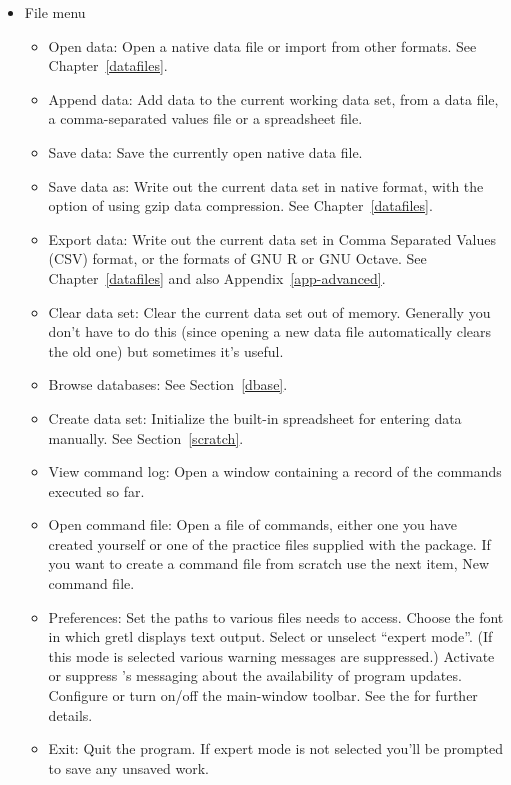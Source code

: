\begin{itemize}
\item \textsf{File menu}
  \begin{itemize}
  \item \textsf{Open data}: Open a native  data file or
    import from other formats.  See Chapter~\ref{datafiles}.
  \item \textsf{Append data}: Add data to the current working data
    set, from a  data file, a comma-separated values file
    or a spreadsheet file.
  \item \textsf{Save data}: Save the currently open native 
    data file.
  \item \textsf{Save data as}: Write out the current data set in
    native format, with the option of using gzip data compression. See
    Chapter~\ref{datafiles}.
  \item \textsf{Export data}: Write out the current data set in Comma
    Separated Values (CSV) format, or the formats of GNU R or GNU
    Octave. See Chapter~\ref{datafiles} and also
    Appendix~\ref{app-advanced}.
  \item \textsf{Clear data set}: Clear the current data set out of
    memory.  Generally you don't have to do this (since opening a new
    data file automatically clears the old one) but sometimes it's
    useful.
  \item \textsf{Browse databases}: See Section~\ref{dbase}.
  \item \textsf{Create data set}: Initialize the built-in spreadsheet
    for entering data manually.  See Section~\ref{scratch}.
  \item \textsf{View command log}: Open a window containing a record
    of the commands executed so far.
  \item \textsf{Open command file}: Open a file of 
    commands, either one you have created yourself or one of the
    practice files supplied with the package.  If you want to create a
    command file from scratch use the next item, \textsf{New command
      file}.
  \item \textsf{Preferences}: Set the paths to various files
     needs to access. Choose the font in which gretl
    displays text output.  Select or unselect ``expert mode''. (If
    this mode is selected various warning messages are suppressed.)
    Activate or suppress 's messaging about the
    availability of program updates.  Configure or turn on/off the
    main-window toolbar. See the \GCR for
    further details.
  \item \textsf{Exit}: Quit the program. If expert mode is not
    selected you'll be prompted to save any unsaved work.
  \end{itemize}


\end{itemize}
